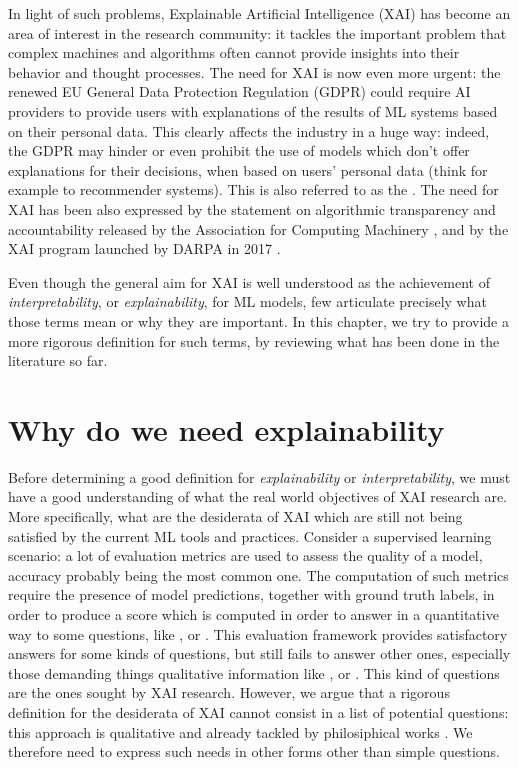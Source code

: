 In light of such problems, Explainable Artificial Intelligence (XAI) has become an area of interest in the research community: it tackles the important problem that complex machines and algorithms often cannot provide insights into their behavior and thought processes. The need for XAI is now even more urgent: the renewed EU General Data Protection Regulation (GDPR) could require AI providers to provide users with explanations of the results of ML systems based on their personal data. This clearly affects the industry in a huge way: indeed, the GDPR may hinder or even prohibit the use of  models which don't offer explanations for their decisions, when based on users' personal data (think for example to recommender systems). This is also referred to as the  \cite{goodman2017european}. The need for XAI has been also expressed by the statement on algorithmic transparency and accountability released by the Association for Computing Machinery \cite{acm2017transparency}, and by the XAI program launched by DARPA in 2017 \cite{gunning2019xai}.

Even though the general aim for XAI is well understood as the achievement of \textit{interpretability}, or \textit{explainability}, for ML models, few articulate precisely what those terms mean or why they are important. In this chapter, we try to provide a more rigorous definition for such terms, by reviewing what has been done in the literature so far. %

\section{Why do we need explainability}
\label{section:whyexpl}
Before determining a good definition for \textit{explainability} or \textit{interpretability}, we must have a good understanding of what the real world objectives of XAI research are. More specifically, what are the desiderata of XAI which are still not being satisfied by the current ML tools and practices. Consider a supervised learning scenario: a lot of evaluation metrics are used to assess the quality of a model, accuracy probably being  the most common one. The computation of such metrics require the presence of model predictions, together with ground truth labels, in order to produce a score which is computed in order to answer in a quantitative way to some questions, like , or . This evaluation framework provides satisfactory answers for some kinds of questions, but still fails to answer other ones, especially those demanding things qualitative information like , or . 
This kind of questions are the ones sought by XAI research. However, we argue that a rigorous definition for the desiderata of XAI cannot consist in a list of potential questions: this approach is qualitative and already tackled by philosiphical works \cite{bromberger1992we}. We therefore need to express such needs in other forms other than simple questions. 

